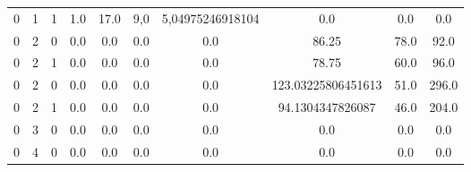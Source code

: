 \begin{table}[ht]
{\begin{tabular}{SSSSSSSSSS}
      0                         & 1                 & 1 & 1.0   & 17.0  & 9,0              & 5,04975246918104 & 0.0                & 0.0  & 0.0   \\
      0                         & 2                 & 0 & 0.0   & 0.0   & 0.0              & 0.0              & 86.25              & 78.0 & 92.0  \\
      0                         & 2                 & 1 & 0.0   & 0.0   & 0.0              & 0.0              & 78.75              & 60.0 & 96.0  \\
      0                         & 2                 & 0 & 0.0   & 0.0   & 0.0              & 0.0              & 123.03225806451613 & 51.0 & 296.0 \\
      0                         & 2                 & 1 & 0.0   & 0.0   & 0.0              & 0.0              & 94.1304347826087   & 46.0 & 204.0 \\
      0                         & 3                 & 0 & 0.0   & 0.0   & 0.0              & 0.0              & 0.0                & 0.0  & 0.0   \\
      0                         & 4                 & 0 & 0.0   & 0.0   & 0.0              & 0.0              & 0.0                & 0.0  & 0.0   \\
      \bottomrule
    \end{tabular}\label{table:feature_table_example}
  }
\end{table}
